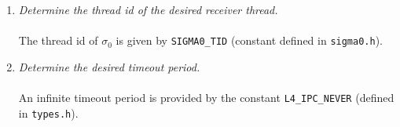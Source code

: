 \begin{enumerate}
\begin{enumerate}
  \item \emph{Copy in fpage descriptors (if any).} \\ \\
    \hspace*{10pt} No fpages in this example.
    
  \item \emph{Copy in by-value data (if any).} \\ \\
    \hspace*{10pt} No in-memory fpages but have two dwords of 
    by-value data. \\ \\
    \hspace*{20pt} {\footnotesize\verb+lmsg.buf[0] = buf[8];+} \\
    \hspace*{20pt} {\footnotesize\verb+lmsg.buf[1] = buf[9];+} 
    
  \item \emph{Copy in (send) string dopes, one for each string.} \\ \\
    \hspace*{10pt} One string dope describing one send string and 
    no receive string. \\ \\
    \hspace*{20pt} {\footnotesize\verb+lmsg.strdope.snd_size = strlen(sbuf); /* size of string in bytes */+}\\
    \hspace*{20pt} {\footnotesize\verb+lmsg.strdope.snd_str = sbuf; /* start of string */+}\\
    \hspace*{20pt} {\footnotesize\verb+lmsg.strdope.rcv_size = 0; /* no receive string */+}\\
    \hspace*{20pt} {\footnotesize\verb+lmsg.strdope.rcv_str = 0;+} 
  \end{enumerate} 
  
\item \emph{Determine the thread id of the desired receiver thread.} \\
  \\ \hspace*{10pt}
  The thread id of $\sigma_0$ is given by {\footnotesize\verb+SIGMA0_TID+} 
  (constant defined in {\footnotesize\verb+sigma0.h+}). 
  
\item \emph{Determine the desired timeout period.} \\ \\ \hspace*{10pt}
  An infinite timeout period is provided by the constant 
  {\footnotesize\verb+L4_IPC_NEVER+} (defined in {\footnotesize\verb+types.h+}). 
  

\end{enumerate}
